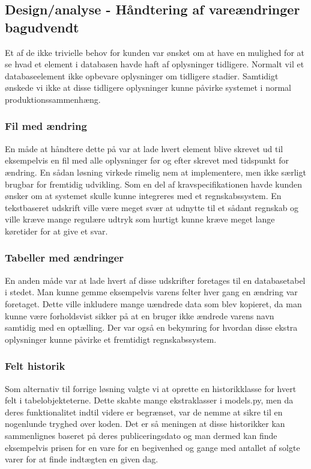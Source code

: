\documentclass[]{article}
\begin{document}
\subsection{Design/analyse - Håndtering af vareændringer bagudvendt}

Et af de ikke trivielle behov for kunden var ønsket om at have en mulighed for at se hvad et element i databasen havde haft af oplysninger tidligere. Normalt vil et databaseelement ikke opbevare oplysninger om tidligere stadier. Samtidigt ønskede vi ikke at disse tidligere oplysninger kunne påvirke systemet i normal produktionssammenhæng.

\subsubsection{Fil med ændring}
En måde at håndtere dette på var at lade hvert element blive skrevet ud til eksempelvis en fil med alle oplysninger før og efter skrevet med tidspunkt for ændring. En sådan løsning virkede rimelig nem at implementere, men ikke særligt brugbar for fremtidig udvikling. Som en del af kravspecifikationen havde kunden ønsker om at systemet skulle kunne integreres med et regnskabssystem. En tekstbaseret udskrift ville være meget svær at udnytte til et sådant regnskab og ville kræve mange regulære udtryk som hurtigt kunne kræve meget lange køretider for at give et svar.

\subsubsection{Tabeller med ændringer}
En anden måde var at lade hvert af disse udskrifter foretages til en databasetabel i stedet. Man kunne gemme eksempelvis varens felter hver gang en ændring var foretaget. Dette ville inkludere mange uændrede data som blev kopieret, da man kunne være forholdsvist sikker på at en bruger ikke ændrede varens navn samtidig med en optælling. Der var også en bekymring for hvordan disse ekstra oplysninger kunne påvirke et fremtidigt regnskabssystem.

\subsubsection{Felt historik}
Som alternativ til forrige løsning valgte vi at oprette en historikklasse for hvert felt i tabelobjekteterne. Dette skabte mange ekstraklasser i models.py, men da deres funktionalitet indtil videre er begrænset, var de nemme at sikre til en nogenlunde tryghed over koden. Det er så meningen at disse historikker kan sammenlignes baseret på deres publiceringsdato og man dermed kan finde eksempelvis prisen for en vare for en begivenhed og gange med antallet af solgte varer for at finde indtægten en given dag.
\pagebreak[3]
\end{document}
